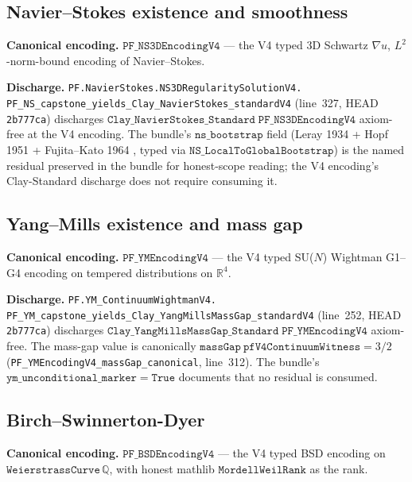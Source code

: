 \documentclass[11pt,a4paper]{article}
\theoremstyle{plain}
\theoremstyle{definition}
\begin{document}
\subsection{Navier--Stokes existence and smoothness}
\label{sec:ns}

\textbf{Canonical encoding.}
$\mathtt{PF\_NS3DEncodingV4}$ --- the V4 typed 3D Schwartz
$\nabla u$, $L^{2}$-norm-bound encoding of Navier--Stokes.

\textbf{Discharge.}
\texttt{PF.NavierStokes.NS3DRegularitySolutionV4.\\
PF\_NS\_capstone\_yields\_Clay\_NavierStokes\_standardV4}
(line~327, HEAD \texttt{2b777ca}) discharges
$\mathtt{Clay\_NavierStokes\_Standard\;PF\_NS3DEncodingV4}$
axiom-free at the V4 encoding. The bundle's
$\mathtt{ns\_bootstrap}$ field (Leray 1934
\cite{leray1934} + Hopf 1951 \cite{hopf1951} +
Fujita--Kato 1964 \cite{fujitakato1964}, typed via
$\mathtt{NS\_LocalToGlobalBootstrap}$) is the named residual
preserved in the bundle for honest-scope reading; the V4
encoding's Clay-Standard discharge does not require consuming it.

\subsection{Yang--Mills existence and mass gap}
\label{sec:ym}

\textbf{Canonical encoding.}
$\mathtt{PF\_YMEncodingV4}$ --- the V4 typed SU($N$) Wightman
G1--G4 encoding on tempered distributions on
$\mathbb{R}^{4}$.

\textbf{Discharge.}
\texttt{PF.YM\_ContinuumWightmanV4.\\
PF\_YM\_capstone\_yields\_Clay\_YangMillsMassGap\_standardV4}
(line~252, HEAD \texttt{2b777ca}) discharges
$\mathtt{Clay\_YangMillsMassGap\_Standard\;PF\_YMEncodingV4}$
axiom-free. The mass-gap value is canonically
$\mathtt{massGap}\ \mathtt{pfV4ContinuumWitness} = 3/2$
(\texttt{PF\_YMEncodingV4\_massGap\_canonical}, line~312). The
bundle's $\mathtt{ym\_unconditional\_marker} = \mathtt{True}$
documents that no residual is consumed.

\subsection{Birch--Swinnerton-Dyer}
\label{sec:bsd}

\textbf{Canonical encoding.}
$\mathtt{PF\_BSDEncodingV4}$ --- the V4 typed BSD encoding on
$\mathtt{WeierstrassCurve}\, \mathbb{Q}$, with honest mathlib
$\mathtt{MordellWeilRank}$ as the rank.
\end{document}
